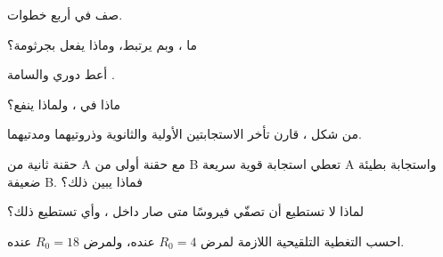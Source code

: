 \begin{exercise}[$\star$]\label{exo:g12:adaptive-immunity:2}
صف  في أربع خطوات.
\end{exercise}

\begin{exercise}[$\star$]\label{exo:g12:adaptive-immunity:3}
ما ، وبم يرتبط، وماذا يفعل بجرثومة؟
\end{exercise}

\begin{exercise}[$\star$]\label{exo:g12:adaptive-immunity:4}
أعط دوري  والسامة .
\end{exercise}

\begin{exercise}[$\star$]\label{exo:g12:adaptive-immunity:5}
ماذا في ، ولماذا ينفع؟
\end{exercise}

\begin{exercise}[$\star\star$]\label{exo:g12:adaptive-immunity:6}
من شكل ، قارن تأخر الاستجابتين الأولية والثانوية
وذروتيهما ومدتيهما.
\end{exercise}

\begin{exercise}[$\star\star$]\label{exo:g12:adaptive-immunity:7}
حقنة ثانية من  A مع حقنة أولى من  B تعطي استجابة قوية
سريعة  A واستجابة بطيئة ضعيفة  B. فماذا يبين ذلك؟
\end{exercise}

\begin{exercise}[$\star\star$]\label{exo:g12:adaptive-immunity:8}
لماذا لا تستطيع  أن تصفّي فيروسًا متى صار داخل ،
وأي  تستطيع ذلك؟
\end{exercise}

\begin{exercise}[$\star\star$]\label{exo:g12:adaptive-immunity:9}
احسب التغطية التلقيحية اللازمة لمرض $R_0 = 4$ عنده، ولمرض
$R_0 = 18$ عنده.
\end{exercise}

